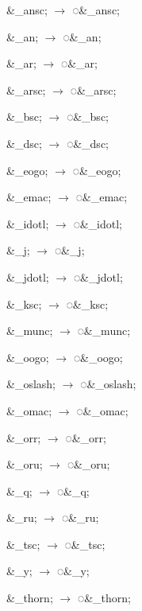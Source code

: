\documentclass[12pt,letterpaper,openany]{book}
\newcommand\textstyleEntityRef[1]{\textrm{#1}}
\begin{document}
\begin{multicols}{3}
\color{RViolet}
\&{\textcompwordmark}\_ansc; $\rightarrow $
\textstyleEntityRef{◌\&\_ansc;}

\&{\textcompwordmark}\_an; $\rightarrow $
\textstyleEntityRef{◌\&\_an;}

\&{\textcompwordmark}\_ar; $\rightarrow $
\textstyleEntityRef{◌\&\_ar;}

\&{\textcompwordmark}\_arsc; $\rightarrow $
\textstyleEntityRef{◌\&\_arsc;}

\&{\textcompwordmark}\_bsc; $\rightarrow $
\textstyleEntityRef{◌\&\_bsc;}

\&{\textcompwordmark}\_dsc; $\rightarrow $
\textstyleEntityRef{◌\&\_dsc;}

\&{\textcompwordmark}\_eogo; $\rightarrow $
\textstyleEntityRef{◌\&\_eogo;}

\&{\textcompwordmark}\_emac; $\rightarrow $
\textstyleEntityRef{◌\&\_emac;}

\&\_{\textcompwordmark}idotl; $\rightarrow $
\textstyleEntityRef{◌\&\_idotl;}

\&\_{\textcompwordmark}j; $\rightarrow $
\textstyleEntityRef{◌\&\_j;}

\&\_{\textcompwordmark}jdotl; $\rightarrow $
\textstyleEntityRef{◌\&\_jdotl;}

\&\_{\textcompwordmark}ksc; $\rightarrow $
\textstyleEntityRef{◌\&\_ksc;}

{\narrow\&\_{\textcompwordmark}munc; $\rightarrow $
\textstyleEntityRef{◌\&\_munc;}}

\&\_{\textcompwordmark}oogo; $\rightarrow $
\textstyleEntityRef{◌\&\_oogo;}

{\narrow\&\_{\textcompwordmark}oslash; $\rightarrow $
\textstyleEntityRef{◌\&\_oslash;}}

\&\_{\textcompwordmark}omac; $\rightarrow $
\textstyleEntityRef{◌\&\_omac;}

\&\_{\textcompwordmark}orr; $\rightarrow $
\textstyleEntityRef{◌\&\_orr;}

\&\_{\textcompwordmark}oru; $\rightarrow $
\textstyleEntityRef{◌\&\_oru;}

\&\_{\textcompwordmark}q; $\rightarrow $
\textstyleEntityRef{◌\&\_q;}

\&\_{\textcompwordmark}ru; $\rightarrow $
\textstyleEntityRef{◌\&\_ru;}

\&\_{\textcompwordmark}tsc; $\rightarrow $
\textstyleEntityRef{◌\&\_tsc;}

\&\_{\textcompwordmark}y; $\rightarrow $
\textstyleEntityRef{◌\&\_y;}

{\narrow\&\_{\textcompwordmark}thorn; $\rightarrow $
\textstyleEntityRef{◌\&\_thorn;}}
\end{multicols}
\end{document}
